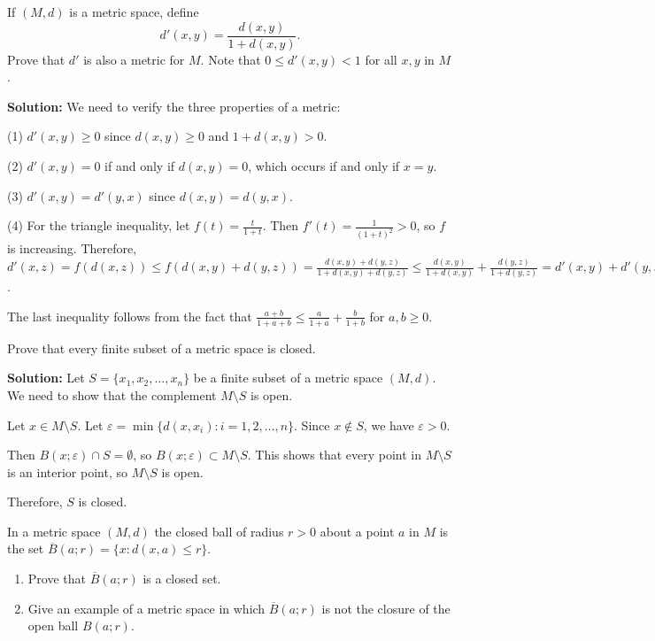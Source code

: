 \begin{problembox}
If \( (M, d) \) is a metric space, define
\[d'(x, y) = \frac{d(x, y)}{1 + d(x, y)}.\]
Prove that \( d' \) is also a metric for \( M \). Note that \( 0 \leq d'(x, y) < 1 \) for all \( x, y \) in \( M \).
\end{problembox}

\textbf{Solution:} We need to verify the three properties of a metric:

(1) $d'(x,y) \geq 0$ since $d(x,y) \geq 0$ and $1 + d(x,y) > 0$.

(2) $d'(x,y) = 0$ if and only if $d(x,y) = 0$, which occurs if and only if $x = y$.

(3) $d'(x,y) = d'(y,x)$ since $d(x,y) = d(y,x)$.

(4) For the triangle inequality, let $f(t) = \frac{t}{1+t}$. Then $f'(t) = \frac{1}{(1+t)^2} > 0$, so $f$ is increasing. Therefore, $d'(x,z) = f(d(x,z)) \leq f(d(x,y) + d(y,z)) = \frac{d(x,y) + d(y,z)}{1 + d(x,y) + d(y,z)} \leq \frac{d(x,y)}{1 + d(x,y)} + \frac{d(y,z)}{1 + d(y,z)} = d'(x,y) + d'(y,z)$.

The last inequality follows from the fact that $\frac{a+b}{1+a+b} \leq \frac{a}{1+a} + \frac{b}{1+b}$ for $a,b \geq 0$.

\begin{problembox}
Prove that every finite subset of a metric space is closed.
\end{problembox}

\textbf{Solution:} Let $S = \{x_1, x_2, \ldots, x_n\}$ be a finite subset of a metric space $(M,d)$. We need to show that the complement $M \setminus S$ is open.

Let $x \in M \setminus S$. Let $\varepsilon = \min\{d(x,x_i) : i = 1,2,\ldots,n\}$. Since $x \notin S$, we have $\varepsilon > 0$.

Then $B(x;\varepsilon) \cap S = \emptyset$, so $B(x;\varepsilon) \subset M \setminus S$. This shows that every point in $M \setminus S$ is an interior point, so $M \setminus S$ is open.

Therefore, $S$ is closed.

\begin{problembox}
In a metric space \((M, d)\) the closed ball of radius \( r > 0 \) about a point \( a \) in \( M \) is the set \( \overline{B}(a; r) = \{x : d(x, a) \leq r\} \).
\begin{enumerate}[label=\alph*)]
\item Prove that \( \overline{B}(a; r) \) is a closed set.
\item Give an example of a metric space in which \( \overline{B}(a; r) \) is not the closure of the open ball \( B(a; r) \).
\end{enumerate}
\end{problembox}


